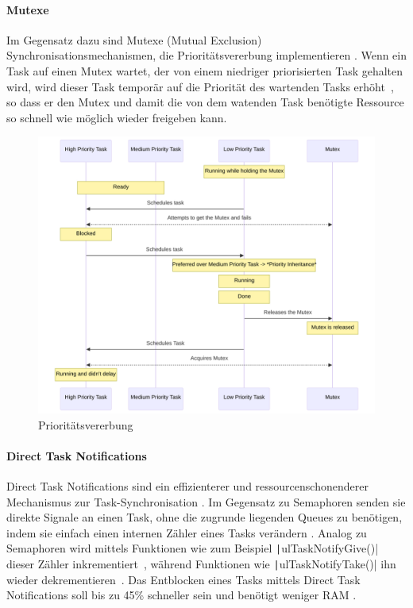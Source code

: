 \paragraph{Mutexe}

Im Gegensatz dazu sind Mutexe (Mutual Exclusion) Synchronisationsmechanismen,
die Prioritätsvererbung implementieren \cite{freertos_mutexes}. Wenn ein Task
auf einen Mutex wartet, der von einem niedriger priorisierten Task gehalten
wird, wird dieser Task temporär auf die Priorität des wartenden Tasks
erhöht~\cite{FreertosForumSemphMtx}, so dass er den Mutex und damit die von dem
watenden Task benötigte Ressource so schnell wie möglich wieder freigeben kann.

\begin{figure}[htb]
    \centering
    \includegraphics[width=1\textwidth]{assets/prio_inheritance}
    \caption{Prioritätsvererbung}
\end{figure}

\paragraph{Direct Task Notifications} \label{sec:direct_task_notification}

Direct Task Notifications sind ein effizienterer und ressourcenschonenderer
Mechanismus zur Task-Synchronisation \cite{freertos_task_notifications_desc}. Im
Gegensatz zu Semaphoren senden sie direkte Signale an einen Task, ohne die
zugrunde liegenden Queues zu benötigen, indem sie einfach einen internen Zähler
eines Tasks verändern \cite{freertos_tasks_c_213}. Analog zu Semaphoren wird
mittels Funktionen wie zum Beispiel \texttt|ulTaskNotifyGive()| dieser
Zähler inkrementiert~\cite{freertos_tasks_c_4296}, während Funktionen wie
\texttt|ulTaskNotifyTake()| ihn wieder
dekrementieren~\cite{freertos_tasks_c_3926}. Das Entblocken eines Tasks mittels
Direct Task Notifications soll bis zu 45\% schneller sein und benötigt weniger
RAM \cite{freertos_task_notifications_usage}.

